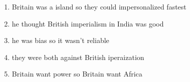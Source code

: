 

\begin{enumerate}
  \item Britain was a island so they could impersonalized fastest
  \item he thought British imperialism in India was good
  \item he was bias so it wasn't reliable
  \item they were both against British iperaization
  \item Britain want power so Britain want Africa
\end{enumerate}



